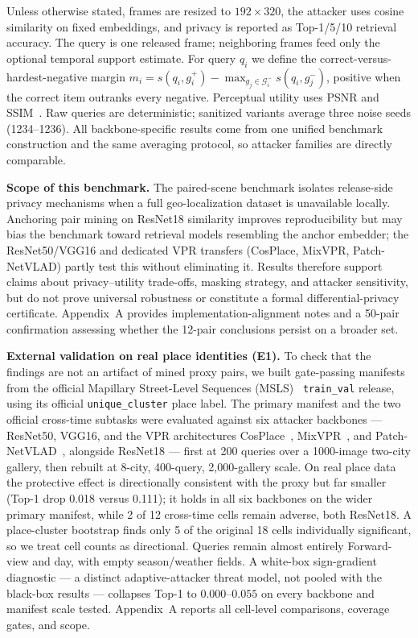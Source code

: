 \documentclass[10pt,journal]{IEEEtran}
\begin{document}
Unless otherwise stated, frames are resized to $192\times 320$, the attacker uses cosine similarity on fixed embeddings, and privacy is reported as Top-1/5/10 retrieval accuracy. The query is one released frame; neighboring frames feed only the optional temporal support estimate. For query $q_i$ we define the correct-versus-hardest-negative margin $m_i=s(q_i,g_i^+)-\max_{g_j\in\mathcal{G}_i^-}s(q_i,g_j^-)$, positive when the correct item outranks every negative. Perceptual utility uses PSNR and SSIM~\cite{wang2004image}. Raw queries are deterministic; sanitized variants average three noise seeds (1234--1236). All backbone-specific results come from one unified benchmark construction and the same averaging protocol, so attacker families are directly comparable.

\textbf{Scope of this benchmark.} The paired-scene benchmark isolates release-side privacy mechanisms when a full geo-localization dataset is unavailable locally. Anchoring pair mining on ResNet18 similarity improves reproducibility but may bias the benchmark toward retrieval models resembling the anchor embedder; the ResNet50/VGG16 and dedicated VPR transfers (CosPlace, MixVPR, Patch-NetVLAD) partly test this without eliminating it. Results therefore support claims about privacy--utility trade-offs, masking strategy, and attacker sensitivity, but do not prove universal robustness or constitute a formal differential-privacy certificate. Appendix~A provides implementation-alignment notes and a 50-pair confirmation assessing whether the 12-pair conclusions persist on a broader set.

\textbf{External validation on real place identities (E1).} To check that the
findings are not an artifact of mined proxy pairs, we built gate-passing
manifests from the official Mapillary Street-Level Sequences
(MSLS)~\cite{mapillarymsls2020} \texttt{train\_val} release, using its
official \texttt{unique\_cluster} place label. The primary manifest and the
two official cross-time subtasks were evaluated against six attacker
backbones --- ResNet50, VGG16, and the VPR architectures
CosPlace~\cite{berton2022rethinking}, MixVPR~\cite{ali2023mixvpr}, and
Patch-NetVLAD~\cite{hausler2021patchnetvlad}, alongside ResNet18 --- first at
200 queries over a 1000-image two-city gallery, then rebuilt at 8-city,
400-query, 2,000-gallery scale. On real place data the protective effect is
directionally consistent with the proxy but far smaller (Top-1 drop 0.018
versus 0.111); it holds in all six backbones on the wider primary manifest,
while 2 of 12 cross-time cells remain adverse, both ResNet18. A place-cluster
bootstrap finds only 5 of the original 18 cells individually significant, so
we treat cell counts as directional. Queries remain almost entirely
Forward-view and day, with empty season/weather fields. A white-box
sign-gradient diagnostic --- a distinct adaptive-attacker threat model, not
pooled with the black-box results --- collapses Top-1 to $0.000$--$0.055$ on
every backbone and manifest scale tested. Appendix~A reports all cell-level
comparisons, coverage gates, and scope.
\end{document}
